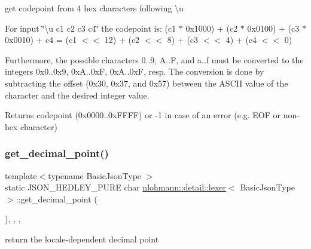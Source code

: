 get codepoint from 4 hex characters following {\ttfamily \textbackslash{}u} 

For input \char`\"{}\textbackslash{}u c1 c2 c3 c4\char`\"{} the codepoint is\+: (c1 $\ast$ 0x1000) + (c2 $\ast$ 0x0100) + (c3 $\ast$ 0x0010) + c4 = (c1 $<$$<$ 12) + (c2 $<$$<$ 8) + (c3 $<$$<$ 4) + (c4 $<$$<$ 0)

Furthermore, the possible characters \textquotesingle{}0\textquotesingle{}..\textquotesingle{}9\textquotesingle{}, \textquotesingle{}A\textquotesingle{}..\textquotesingle{}F\textquotesingle{}, and \textquotesingle{}a\textquotesingle{}..\textquotesingle{}f\textquotesingle{} must be converted to the integers 0x0..0x9, 0xA..0xF, 0xA..0xF, resp. The conversion is done by subtracting the offset (0x30, 0x37, and 0x57) between the A\+S\+C\+II value of the character and the desired integer value.

\begin{DoxyReturn}{Returns}
codepoint (0x0000..0x\+F\+F\+FF) or -\/1 in case of an error (e.\+g. E\+OF or non-\/hex character) 
\end{DoxyReturn}
\mbox{\label{classnlohmann_1_1detail_1_1lexer_ae90334f30e7c12d5394c116bcfecac19}} 
\subsubsection{\texorpdfstring{get\+\_\+decimal\+\_\+point()}{get\_decimal\_point()}}
{\footnotesize\ttfamily template$<$typename Basic\+Json\+Type $>$ \\
static J\+S\+O\+N\+\_\+\+H\+E\+D\+L\+E\+Y\+\_\+\+P\+U\+RE char \hyperlink{classnlohmann_1_1detail_1_1lexer}{nlohmann\+::detail\+::lexer}$<$ Basic\+Json\+Type $>$\+::get\+\_\+decimal\+\_\+point (\begin{DoxyParamCaption}{ }\end{DoxyParamCaption})\hspace{0.3cm}{\ttfamily [inline]}, {\ttfamily [static]}, {\ttfamily [private]}, {\ttfamily [noexcept]}}



return the locale-\/dependent decimal point 

\mbox{\label{classnlohmann_1_1detail_1_1lexer_a3cead908f797ffa091bb67e90985739d}} 
